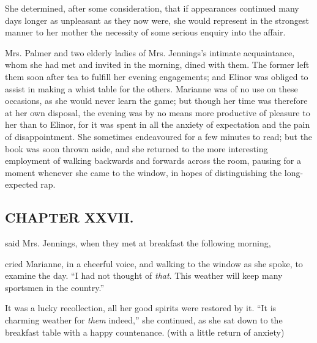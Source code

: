 She determined, after some consideration, that if appearances continued many days longer as unpleasant as they now were, she would represent in the strongest manner to her mother the necessity of some serious enquiry into the affair.

Mrs. Palmer and two elderly ladies of Mrs. Jennings's intimate acquaintance, whom she had met and invited in the morning, dined with them. The former left them soon after tea to fulfill her evening engagements; and Elinor was obliged to assist in making a whist table for the others. Marianne was of no use on these occasions, as she would never learn the game; but though her time was therefore at her own disposal, the evening was by no means more productive of pleasure to her than to Elinor, for it was spent in all the anxiety of expectation and the pain of disappointment. She sometimes endeavoured for a few minutes to read; but the book was soon thrown aside, and she returned to the more interesting employment of walking backwards and forwards across the room, pausing for a moment whenever she came to the window, in hopes of distinguishing the long-expected rap.

\subsection[chapter-xxvii.]{\useURL[url27][][][]\from[url27]CHAPTER XXVII.}

 said Mrs. Jennings, when they met at breakfast the following morning, 

 cried Marianne, in a cheerful voice, and walking to the window as she spoke, to examine the day. “I had not thought of {\em that}. This weather will keep many sportsmen in the country.”

It was a lucky recollection, all her good spirits were restored by it. “It is charming weather for {\em them} indeed,” she continued, as she sat down to the breakfast table with a happy countenance.  (with a little return of anxiety) 

